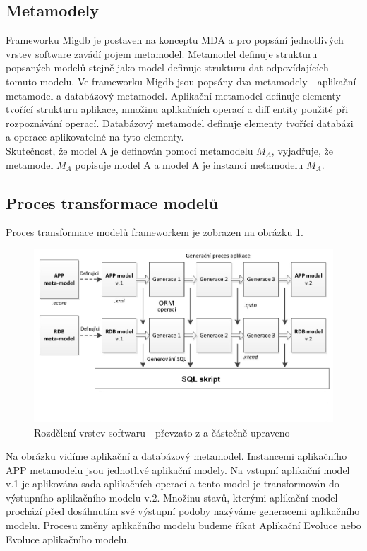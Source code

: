 \documentclass[11pt,twoside,a4paper]{book}
\begin{document}
\subsection{Metamodely}
Frameworku Migdb je postaven na konceptu MDA \cite{MDA} a pro popsání
jednotlivých vrstev software zavádí pojem metamodel. Metamodel definuje
strukturu popsaných modelů stejně jako model definuje
strukturu dat odpovídajících tomuto modelu.
%
Ve frameworku Migdb jsou popsány dva metamodely - aplikační metamodel a
databázový metamodel. Aplikační metamodel definuje elementy tvořící strukturu
aplikace, množinu aplikačních operací a diff entity použité při rozpoznávání
operací. Databázový metamodel definuje elementy tvořící databázi a operace
aplikovatelné na tyto elementy.\\

Skutečnost, že model A je definován pomocí metamodelu $M_A$, vyjadřuje, že
metamodel $M_A$ popisuje model A a model A je instancí metamodelu $M_A$.

\subsection{Proces transformace modelů}
Proces transformace modelů frameworkem je zobrazen na obrázku
\ref{fig:framework:modified}.
%
\begin{figure}[H]
\begin{center}
\includegraphics[width=15cm]{figures/framework_structura_tarant_modified}
\caption{Rozdělení vrstev softwaru - převzato z \cite{Tarant_bp} a částečně
upraveno}
\label{fig:framework:modified}
\end{center}
\end{figure}
%
Na obrázku vidíme aplikační a databázový metamodel. Instancemi aplikačního APP
metamodelu jsou jednotlivé aplikační modely. Na vstupní aplikační model v.1 je aplikována
sada aplikačních operací a tento model je transformován do 
výstupního aplikačního modelu v.2. Množinu stavů, kterými aplikační model
prochází před dosáhnutím své výstupní podoby nazýváme generacemi aplikačního
modelu. Procesu změny aplikačního modelu budeme říkat Aplikační Evoluce nebo
Evoluce aplikačního modelu.
\end{document}
